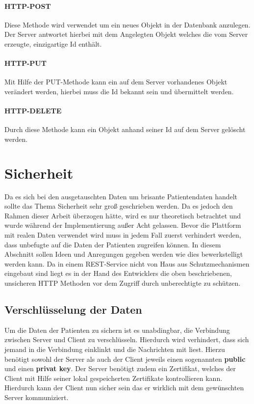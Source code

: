 \paragraph{HTTP-POST}
Diese Methode wird verwendet um ein neues Objekt in der Datenbank anzulegen. Der Server antwortet hierbei mit dem Angelegten Objekt welches die vom Server erzeugte, einzigartige Id enthält.
\paragraph{HTTP-PUT}
Mit Hilfe der PUT-Methode kann ein auf dem Server vorhandenes Objekt verändert werden, hierbei muss die Id bekannt sein und übermittelt werden.
\paragraph{HTTP-DELETE}
Durch diese Methode kann ein Objekt anhand seiner Id auf dem Server gelöscht werden.

\section{Sicherheit}\label{_GrundlagenSicherheit}
Da es sich bei den ausgetauschten Daten um brisante Patientendaten handelt sollte das Thema Sicherheit sehr groß geschrieben werden. Da es jedoch den Rahmen dieser Arbeit überzogen hätte, wird es nur theoretisch betrachtet und wurde während der Implementierung außer Acht gelassen. Bevor die Plattform mit realen Daten verwendet wird muss in jedem Fall zuerst verhindert werden, dass unbefugte auf die Daten der Patienten zugreifen können. In diesem Abschnitt sollen Ideen und Anregungen gegeben werden wie dies bewerkstelligt werden kann. 
Da in einem REST-Service nicht von Haus aus Schutzmechanismen eingebaut sind liegt es in der Hand des Entwicklers die oben beschriebenen, unsicheren HTTP Methoden vor dem Zugriff durch unberechtigte zu schützen.

\subsection{Verschlüsselung der Daten}
Um die Daten der Patienten zu sichern ist es unabdingbar, die Verbindung zwischen Server und Client zu verschlüsseln. Hierdurch wird verhindert, dass sich jemand in die Verbindung einklinkt und die Nachrichten mit liest. 
Hierzu benötigt sowohl der Server als auch der Client jeweils einen sogenannten \textbf{public} und einen \textbf{privat key}. Der Server benötigt zudem ein Zertifikat, welches der Client mit Hilfe seiner lokal gespeicherten Zertifikate kontrollieren kann. Hierdurch kann der Client nun sicher sein das er wirklich mit dem gewünschten Server kommuniziert.

